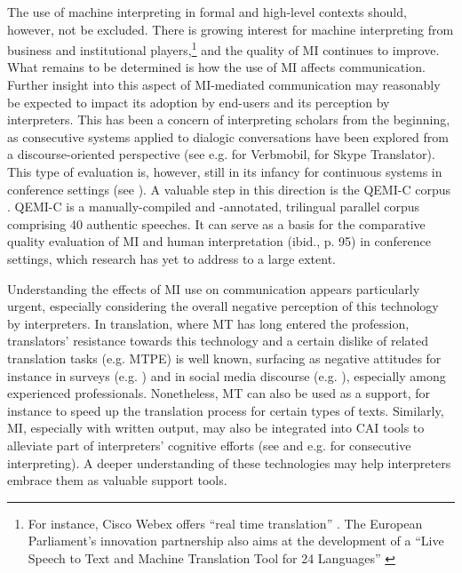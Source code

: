 The use of machine interpreting in formal and high-level contexts should, however, not be excluded. There is growing interest for machine interpreting from business and institutional players,\footnote{For instance, Cisco Webex offers ``real time translation'' \citep{webex2022}. The European Parliament's innovation partnership also aims at the development of a ``Live Speech to Text and Machine Translation Tool for 24 Languages'' \citep{EPtender2019}} and the quality of MI continues to improve. What remains to be determined is how the use of MI affects communication. Further insight into this aspect of MI-mediated communication may reasonably be expected to impact its adoption by end-users and its perception by interpreters. This has been a concern of interpreting scholars from the beginning, as consecutive systems applied to dialogic conversations have been explored from a discourse-oriented perspective (see e.g. \citealt{apfelbaum1997does} for Verbmobil, \citealt{hoberginformationsintegration} for Skype Translator). This type of evaluation is, however, still in its infancy for continuous systems in conference settings (see \citealt{fantinuoli2021evaluation}). A valuable step in this direction is the QEMI-C corpus \citep{mauri2021QEMIC}. QEMI-C is a manually-compiled and -annotated, trilingual parallel corpus comprising 40 authentic speeches. It can serve as a basis for the comparative quality evaluation of MI and human interpretation (ibid., p. 95) in conference settings, which research has yet to address to a large extent.

Understanding the effects of MI use on communication appears particularly urgent, especially considering the overall negative perception of this technology by interpreters. In translation, where MT has long entered the profession, translators' resistance towards this technology and a certain dislike of related translation tasks (e.g. MTPE) is well known, surfacing as negative attitudes for instance in surveys (e.g. \citealt{moorkens2015post}) and in social media discourse (e.g. \citealt{laubli2017google}), especially among experienced professionals. Nonetheless, MT can also be used as a support, for instance to speed up the translation process for certain types of texts. Similarly, MI, especially with written output, may also be integrated into CAI tools to alleviate part of interpreters' cognitive efforts (see  and e.g. \citealt{wang2019can} for consecutive interpreting). A deeper understanding of these technologies may help interpreters embrace them as valuable support tools.

